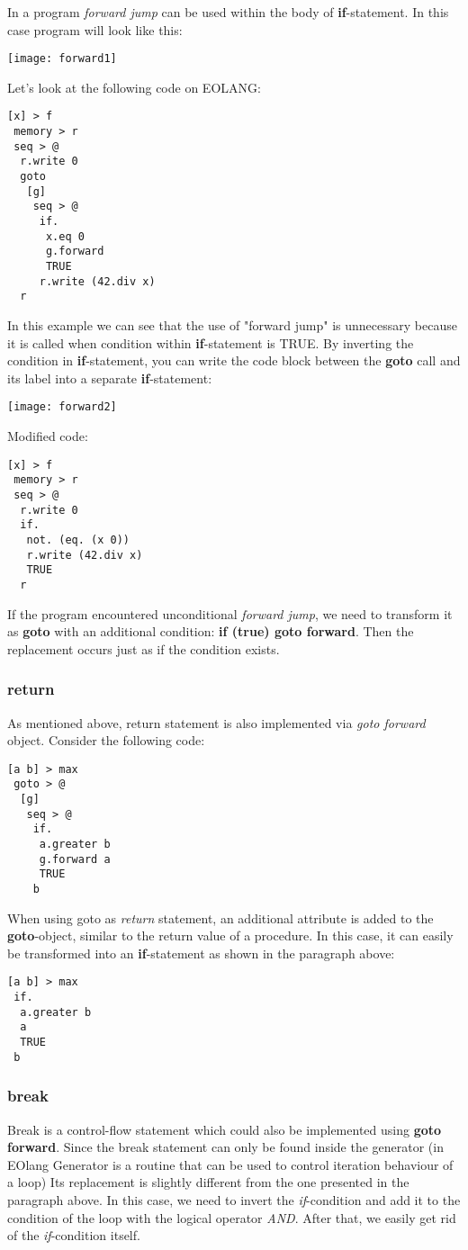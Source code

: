 \documentclass[two column]{article}
\begin{document}
In a program \textit{forward jump} can be used within the body of \textbf{if}-statement. In this case program will look like this:

\texttt{[image: forward1]}

Let's look at the following code on EOLANG:
\begin{lstlisting}
[x] > f
 memory > r
 seq > @
  r.write 0
  goto
   [g]
    seq > @
     if.
      x.eq 0
      g.forward
      TRUE
     r.write (42.div x)
  r
\end{lstlisting}

In this example we can see that the use of "forward jump" is unnecessary because it is called when condition within \textbf{if}-statement is TRUE. By inverting the condition in \textbf{if}-statement, you can write the code block between the \textbf{goto} call and its label into a separate \textbf{if}-statement:

\texttt{[image: forward2]}

Modified code:
\begin{lstlisting}
[x] > f
 memory > r
 seq > @
  r.write 0
  if.
   not. (eq. (x 0))
   r.write (42.div x)
   TRUE
  r
\end{lstlisting}

If the program encountered unconditional \textit{forward jump}, we need to transform it as \textbf{goto} with an additional condition: \textbf{if (true) goto forward}. Then the replacement occurs just as if the condition exists.

\subsubsection{return}
As mentioned above, return statement is also implemented via \textit{goto forward} object. Consider the following code:
\begin{lstlisting}
[a b] > max
 goto > @
  [g]
   seq > @
    if.
     a.greater b
     g.forward a
     TRUE
    b
\end{lstlisting}
When using goto as \textit{return} statement, an additional attribute is added to the \textbf{goto}-object, similar to the return value of a procedure. In this case, it can easily be transformed into an \textbf{if}-statement as shown in the paragraph above:
\begin{lstlisting}
[a b] > max
 if.
  a.greater b
  a
  TRUE
 b
\end{lstlisting}

\subsubsection{break}
Break is a control-flow statement which could also be implemented using \textbf{goto forward}. Since the break statement can only be found inside the generator (in EOlang Generator is a routine that can be used to control iteration behaviour of a loop) Its replacement is slightly different from the one presented in the paragraph above. In this case, we need to invert the \textit{if}-condition and add it to the condition of the loop with the logical operator \textit{AND}. After that, we easily get rid of the \textit{if}-condition itself.
\end{document}
